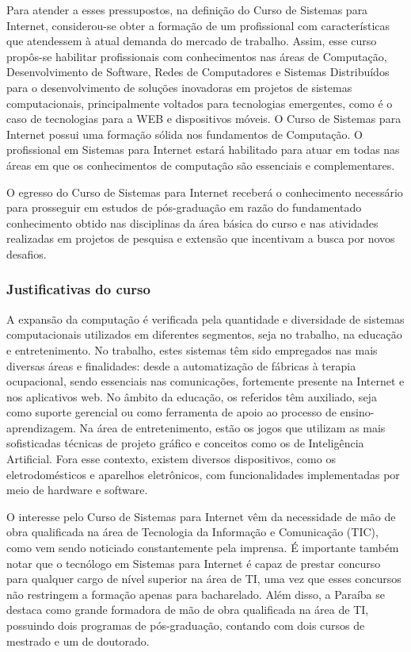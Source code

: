 Para atender a esses pressupostos, na definição do Curso de Sistemas para Internet, considerou-se obter a formação de um profissional com características que atendessem à atual demanda do mercado de trabalho. Assim, esse curso propôs-se habilitar profissionais com conhecimentos nas áreas de Computação, Desenvolvimento de Software, Redes de Computadores e Sistemas Distribu\'idos para o desenvolvimento de soluções inovadoras em projetos de sistemas computacionais, principalmente voltados para tecnologias emergentes, como \'e o caso de tecnologias para a WEB e dispositivos m\'oveis. O Curso de Sistemas para Internet possui uma formação sólida nos fundamentos de Computação. O profissional em Sistemas para Internet estará habilitado para atuar em todas nas áreas em que os conhecimentos de computação são essenciais e complementares.  

O egresso do Curso de Sistemas para Internet receberá o conhecimento necessário para prosseguir em estudos de pós-graduação em razão do fundamentado conhecimento obtido nas disciplinas da área básica do curso e nas atividades realizadas em projetos de pesquisa e extensão que incentivam a busca por novos desafios.

\subsubsection{Justificativas do curso}

A expansão da computação é verificada pela quantidade e diversidade de sistemas computacionais utilizados em diferentes segmentos, seja no trabalho, na educação e entretenimento. No trabalho, estes sistemas têm sido empregados nas mais diversas áreas e finalidades: desde a automatização de fábricas à terapia ocupacional, sendo essenciais nas comunicações, fortemente presente na Internet e nos aplicativos web. No âmbito da educação, os referidos têm auxiliado, seja como suporte gerencial ou como ferramenta de apoio ao processo de ensino-aprendizagem. Na área de entretenimento, estão os jogos que utilizam as mais sofisticadas técnicas de projeto gráfico e conceitos como os de Inteligência Artificial. Fora esse contexto, existem diversos dispositivos, como os eletrodomésticos e aparelhos eletrônicos, com funcionalidades implementadas por meio de hardware e software.


O interesse pelo Curso de Sistemas para Internet vêm da necessidade de mão de obra qualificada na área de Tecnologia da Informação e Comunicação (TIC), como vem sendo noticiado constantemente pela imprensa. É importante também notar que o tecnólogo em Sistemas para Internet é capaz de prestar concurso para qualquer cargo de nível superior na área de TI, uma vez que esses concursos não restringem a formação apenas para bacharelado. Além disso, a Paraíba se destaca como grande formadora de mão de obra qualificada na área de TI, possuindo dois programas de pós-graduação, contando com dois cursos de mestrado e um de doutorado.%

